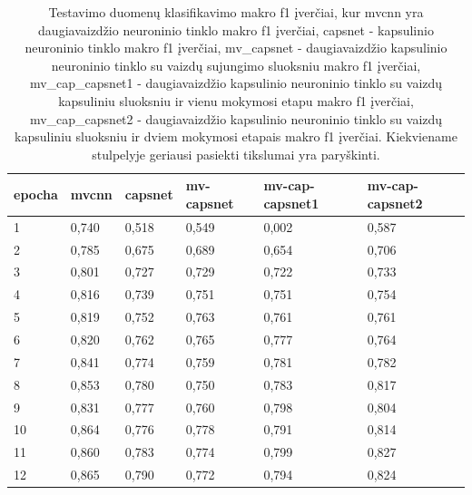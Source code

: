 \begin{table}[]
	\begin{tabular}{l|l|l|l|l|l}
		epocha & mvcnn & capsnet & mv-capsnet & mv-cap-capsnet1 & mv-cap-capsnet2 \\
		\hline
		1 & 0,740 &   0,518 &      0,549 &           0,002 &           0,587 \\
		2 & 0,785 &   0,675 &      0,689 &           0,654 &           0,706 \\
		3 & 0,801 &   0,727 &      0,729 &           0,722 &           0,733 \\
		4 & 0,816 &   0,739 &      0,751 &           0,751 &           0,754 \\
		5 & 0,819 &   0,752 &      0,763 &           0,761 &           0,761 \\
		6 & 0,820 &   0,762 &      0,765 &           0,777 &           0,764 \\
		7 & 0,841 &   0,774 &      0,759 &           0,781 &           0,782 \\
		8 & 0,853 &   0,780 &      0,750 &           0,783 &           0,817 \\
		9 & 0,831 &   0,777 &      0,760 &           0,798 &           0,804 \\
		10 & 0,864 &   0,776 &      0,778 &           0,791 &           0,814 \\
		11 & 0,860 &   0,783 &      0,774 &           0,799 &           0,827 \\
		12 & 0,865 &   0,790 &      0,772 &           0,794 &           0,824 \\
	\end{tabular}
	\caption{
		Testavimo duomenų klasifikavimo makro f1 įverčiai, kur mvcnn yra daugiavaizdžio neuroninio tinklo makro f1 įverčiai, capsnet - kapsulinio neuroninio tinklo makro f1 įverčiai, mv\_capsnet - daugiavaizdžio kapsulinio neuroninio tinklo su vaizdų sujungimo sluoksniu makro f1 įverčiai, mv\_cap\_capsnet1 - daugiavaizdžio kapsulinio neuroninio tinklo su vaizdų kapsuliniu sluoksniu ir vienu mokymosi etapu makro f1 įverčiai, mv\_cap\_capsnet2 - daugiavaizdžio kapsulinio neuroninio tinklo su vaizdų kapsuliniu sluoksniu ir dviem mokymosi etapais makro f1 įverčiai. Kiekviename stulpelyje geriausi pasiekti tikslumai yra paryškinti.
	}
	\label{tbl:macro_f1}
\end{table}


